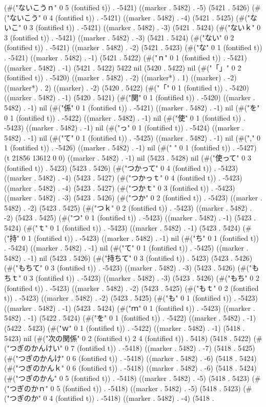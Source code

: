 (#("ないこうｎ" 0 5 (fontified t)) . -5421) ((marker . 5482) . -5) (5421 . 5426) (#("ないこう" 0 4 (fontified t)) . -5421) ((marker . 5482) . -4) (5421 . 5425) (#("ないこ" 0 3 (fontified t)) . -5421) ((marker . 5482) . -3) (5421 . 5424) (#("ないｋ" 0 3 (fontified t)) . -5421) ((marker . 5482) . -3) (5421 . 5424) (#("ない" 0 2 (fontified t)) . -5421) ((marker . 5482) . -2) (5421 . 5423) (#("な" 0 1 (fontified t)) . -5421) ((marker . 5482) . -1) (5421 . 5422) (#("ｎ" 0 1 (fontified t)) . -5421) ((marker . 5482) . -1) (5421 . 5422) 5422 nil (5420 . 5422) nil (#("「」" 0 2 (fontified t)) . -5420) ((marker . 5482) . -2) ((marker*) . 1) ((marker) . -2) ((marker*) . 2) ((marker) . -2) (5420 . 5422) (#("「" 0 1 (fontified t)) . -5420) ((marker . 5482) . -1) (5420 . 5421) (#("関" 0 1 (fontified t)) . -5420) ((marker . 5482) . -1) nil (#("係" 0 1 (fontified t)) . -5421) ((marker . 5482) . -1) nil (#("を" 0 1 (fontified t)) . -5422) ((marker . 5482) . -1) nil (#("使" 0 1 (fontified t)) . -5423) ((marker . 5482) . -1) nil (#("っ" 0 1 (fontified t)) . -5424) ((marker . 5482) . -1) nil (#("て" 0 1 (fontified t)) . -5425) ((marker . 5482) . -1) nil (#("," 0 1 (fontified t)) . -5426) ((marker . 5482) . -1) nil (#(" " 0 1 (fontified t)) . -5427) (t 21856 13612 0 0) ((marker . 5482) . -1) nil (5423 . 5428) nil (#("使って" 0 3 (fontified t)) . 5423) (5423 . 5426) (#("つかって" 0 4 (fontified t)) . -5423) ((marker . 5482) . -4) (5423 . 5427) (#("つかっｔ" 0 4 (fontified t)) . -5423) ((marker . 5482) . -4) (5423 . 5427) (#("つかｔ" 0 3 (fontified t)) . -5423) ((marker . 5482) . -3) (5423 . 5426) (#("つか" 0 2 (fontified t)) . -5423) ((marker . 5482) . -2) (5423 . 5425) (#("つｋ" 0 2 (fontified t)) . -5423) ((marker . 5482) . -2) (5423 . 5425) (#("つ" 0 1 (fontified t)) . -5423) ((marker . 5482) . -1) (5423 . 5424) (#("ｔ" 0 1 (fontified t)) . -5423) ((marker . 5482) . -1) (5423 . 5424) (#("持" 0 1 (fontified t)) . -5423) ((marker . 5482) . -1) nil (#("ち" 0 1 (fontified t)) . -5424) ((marker . 5482) . -1) nil (#("て" 0 1 (fontified t)) . -5425) ((marker . 5482) . -1) nil (5423 . 5426) (#("持ちて" 0 3 (fontified t)) . 5423) (5423 . 5426) (#("もちて" 0 3 (fontified t)) . -5423) ((marker . 5482) . -3) (5423 . 5426) (#("もちｔ" 0 3 (fontified t)) . -5423) ((marker . 5482) . -3) (5423 . 5426) (#("もち" 0 2 (fontified t)) . -5423) ((marker . 5482) . -2) (5423 . 5425) (#("もｔ" 0 2 (fontified t)) . -5423) ((marker . 5482) . -2) (5423 . 5425) (#("も" 0 1 (fontified t)) . -5423) ((marker . 5482) . -1) (5423 . 5424) (#("ｍ" 0 1 (fontified t)) . -5423) ((marker . 5482) . -1) (5422 . 5424) (#("を" 0 1 (fontified t)) . -5422) ((marker . 5482) . -1) (5422 . 5423) (#("ｗ" 0 1 (fontified t)) . -5422) ((marker . 5482) . -1) (5418 . 5423) nil (#("次の関係" 0 2 (fontified t) 2 4 (fontified t)) . 5418) (5418 . 5422) (#("つぎのかんけい" 0 7 (fontified t)) . -5418) ((marker . 5482) . -7) (5418 . 5425) (#("つぎのかんけ" 0 6 (fontified t)) . -5418) ((marker . 5482) . -6) (5418 . 5424) (#("つぎのかんｋ" 0 6 (fontified t)) . -5418) ((marker . 5482) . -6) (5418 . 5424) (#("つぎのかん" 0 5 (fontified t)) . -5418) ((marker . 5482) . -5) (5418 . 5423) (#("つぎのかｎ" 0 5 (fontified t)) . -5418) ((marker . 5482) . -5) (5418 . 5423) (#("つぎのか" 0 4 (fontified t)) . -5418) ((marker . 5482) . -4) (5418 . 